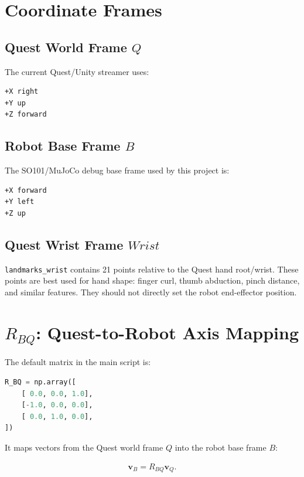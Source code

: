 \documentclass[11pt]{article}
\begin{document}
\section{Coordinate Frames}

\subsection{Quest World Frame $Q$}

The current Quest/Unity streamer uses:

\begin{lstlisting}
+X right
+Y up
+Z forward
\end{lstlisting}

\subsection{Robot Base Frame $B$}

The SO101/MuJoCo debug base frame used by this project is:

\begin{lstlisting}
+X forward
+Y left
+Z up
\end{lstlisting}

\subsection{Quest Wrist Frame $Wrist$}

\texttt{landmarks\_wrist} contains 21 points relative to the Quest hand
root/wrist. These points are best used for hand shape: finger curl, thumb
abduction, pinch distance, and similar features. They should not directly set
the robot end-effector position.

\section{\texorpdfstring{$R_{BQ}$}{R\_BQ}: Quest-to-Robot Axis Mapping}

The default matrix in the main script is:

\begin{lstlisting}[language=Python]
R_BQ = np.array([
    [ 0.0, 0.0, 1.0],
    [-1.0, 0.0, 0.0],
    [ 0.0, 1.0, 0.0],
])
\end{lstlisting}

It maps vectors from the Quest world frame $Q$ into the robot base frame $B$:

\begin{align}
\mathbf{v}_B = R_{BQ}\mathbf{v}_Q .
\end{align}
\end{document}
